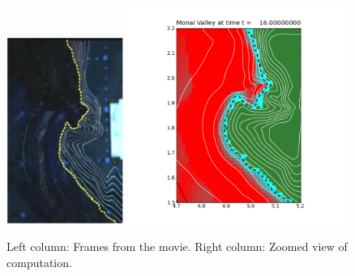 \begin{figure}[ht]
\vskip 5pt
\hfil\includegraphics[width=1.5in]{bp7/movie/Frame40.png}\hfil
\hfil\includegraphics[width=2.8in]{bp7/figs423/frame0009fig10.png}\hfil
\caption{\label{fig:bp7framesA} 
Left column: Frames from the movie.
Right column: Zoomed view of computation.
  }
\end{figure}


